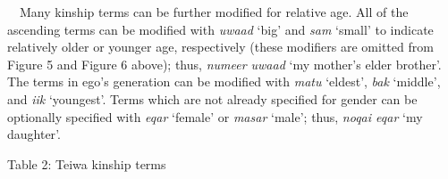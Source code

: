 \ \ Many kinship terms can be further modified for relative age. All of the ascending terms can be modified with \textit{uwaad} {\textquoteleft}big{\textquoteright} and \textit{sam }{\textquoteleft}small{\textquoteright} to indicate relatively older or younger age, respectively (these modifiers are omitted from Figure 5 and Figure 6 above); thus, \textit{numeer uwaad }{\textquoteleft}my mother{\textquoteright}s elder brother{\textquoteright}. The terms in ego{\textquoteright}s generation can be modified with \textit{matu }{\textquoteleft}eldest{\textquoteright}, \textit{bak }{\textquoteleft}middle{\textquoteright}, and \textit{iik }{\textquoteleft}youngest{\textquoteright}.  Terms which are not already specified for gender can be optionally specified with \textit{eqar }{\textquoteleft}female{\textquoteright} or \textit{masar} {\textquoteleft}male{\textquoteright}; thus, \textit{noqai eqar }{\textquoteleft}my daughter{\textquoteright}.

{\centering
Table 2: Teiwa kinship terms
\par}

